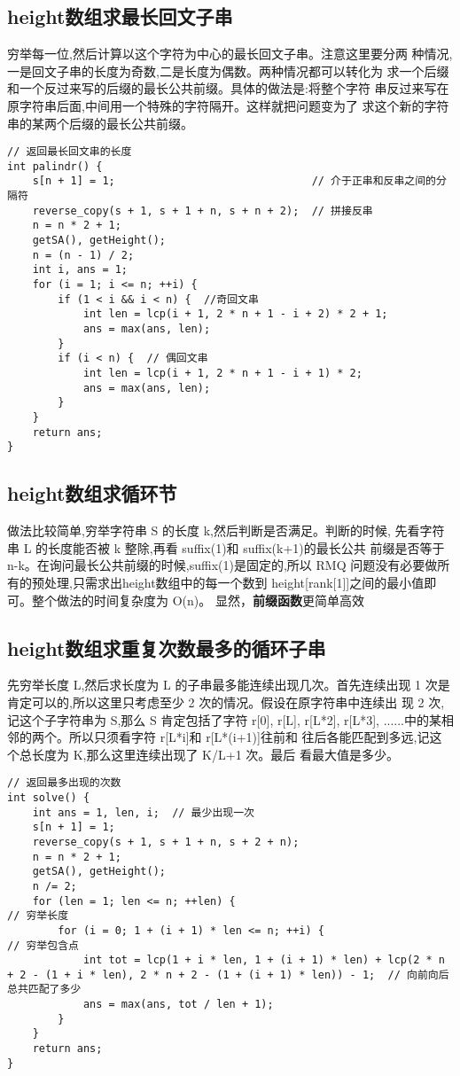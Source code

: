     \subsection{height数组求最长回文子串}
        穷举每一位,然后计算以这个字符为中心的最长回文子串。注意这里要分两
        种情况,一是回文子串的长度为奇数,二是长度为偶数。两种情况都可以转化为
        求一个后缀和一个反过来写的后缀的最长公共前缀。具体的做法是:将整个字符
        串反过来写在原字符串后面,中间用一个特殊的字符隔开。这样就把问题变为了
        求这个新的字符串的某两个后缀的最长公共前缀。
\begin{lstlisting}
// 返回最长回文串的长度
int palindr() {
    s[n + 1] = 1;                               // 介于正串和反串之间的分隔符
    reverse_copy(s + 1, s + 1 + n, s + n + 2);  // 拼接反串
    n = n * 2 + 1;
    getSA(), getHeight();
    n = (n - 1) / 2;
    int i, ans = 1;
    for (i = 1; i <= n; ++i) {
        if (1 < i && i < n) {  //奇回文串
            int len = lcp(i + 1, 2 * n + 1 - i + 2) * 2 + 1;
            ans = max(ans, len);
        }
        if (i < n) {  // 偶回文串
            int len = lcp(i + 1, 2 * n + 1 - i + 1) * 2;
            ans = max(ans, len);
        }
    }
    return ans;
}
\end{lstlisting}
    \subsection{height数组求循环节}
        做法比较简单,穷举字符串 S 的长度 k,然后判断是否满足。判断的时候,
        先看字符串 L 的长度能否被 k 整除,再看 suffix(1)和 suffix(k+1)的最长公共
        前缀是否等于 n-k。在询问最长公共前缀的时候,suffix(1)是固定的,所以 RMQ
        问题没有必要做所有的预处理,只需求出height数组中的每一个数到
        height[rank[1]]之间的最小值即可。整个做法的时间复杂度为 O(n)。
        显然，\textbf{前缀函数}更简单高效
    \subsection{height数组求重复次数最多的循环子串}
        先穷举长度 L,然后求长度为 L 的子串最多能连续出现几次。首先连续出现
        1 次是肯定可以的,所以这里只考虑至少 2 次的情况。假设在原字符串中连续出
        现 2 次,记这个子字符串为 S,那么 S 肯定包括了字符 r[0], r[L], r[L*2],
        r[L*3], ......中的某相邻的两个。所以只须看字符 r[L*i]和 r[L*(i+1)]往前和
        往后各能匹配到多远,记这个总长度为 K,那么这里连续出现了 K/L+1 次。最后
        看最大值是多少。
\begin{lstlisting}
// 返回最多出现的次数
int solve() {
    int ans = 1, len, i;  // 最少出现一次
    s[n + 1] = 1;
    reverse_copy(s + 1, s + 1 + n, s + 2 + n);
    n = n * 2 + 1;
    getSA(), getHeight();
    n /= 2;
    for (len = 1; len <= n; ++len) {                                                                                              // 穷举长度
        for (i = 0; 1 + (i + 1) * len <= n; ++i) {                                                                                // 穷举包含点
            int tot = lcp(1 + i * len, 1 + (i + 1) * len) + lcp(2 * n + 2 - (1 + i * len), 2 * n + 2 - (1 + (i + 1) * len)) - 1;  // 向前向后总共匹配了多少
            ans = max(ans, tot / len + 1);
        }
    }
    return ans;
}
\end{lstlisting}
